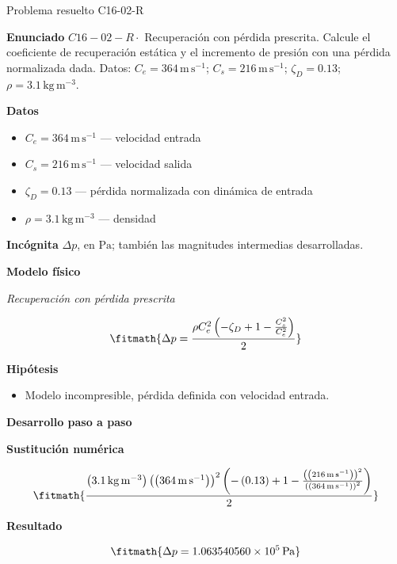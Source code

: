 \documentclass[10pt,openany]{book}
\begin{document}
\begin{studiumworked}{Problema resuelto C16-02-R}


\noindent\textbf{Enunciado}
\(C16-02-R \cdot\) Recuperación con pérdida prescrita. Calcule el coeficiente de recuperación estática y el incremento de presión con una pérdida normalizada dada. Datos: \(C_e=364\, \mathrm{m}\,\mathrm{s}^{-1}\); \(C_s=216\, \mathrm{m}\,\mathrm{s}^{-1}\); \(\zeta_D=0.13\); \(\rho=3.1\, \mathrm{kg}\,\mathrm{m}^{-3}\).

\noindent\textbf{Datos}
\begin{itemize}
\item $C_e = 364\,\mathrm{m}\,\mathrm{s}^{-1}$ — velocidad entrada
\item $C_s = 216\,\mathrm{m}\,\mathrm{s}^{-1}$ — velocidad salida
\item $\zeta_D = 0.13$ — pérdida normalizada con dinámica de entrada
\item $\rho = 3.1\,\mathrm{kg}\,\mathrm{m}^{-3}$ — densidad
\end{itemize}

\noindent\textbf{Incógnita}
$\Delta p$, en $\mathrm{Pa}$; también las magnitudes intermedias desarrolladas.

\noindent\textbf{Modelo físico}

\noindent\textit{Recuperación con pérdida prescrita}

\[
\fitmath{\Delta p=\frac{\rho C_e^{2} \left(- \zeta_D + 1 - \frac{C_s^{2}}{C_e^{2}}\right)}{2}}
\]

\noindent\textbf{Hipótesis}
\begin{itemize}
\item Modelo incompresible, pérdida definida con velocidad entrada.
\end{itemize}

\noindent\textbf{Desarrollo paso a paso}



\noindent\textbf{Sustitución numérica}

\[
\fitmath{\frac{\left(3.1\,\mathrm{kg}\,\mathrm{m}^{-3}\right) \left(\left(364\,\mathrm{m}\,\mathrm{s}^{-1}\right)\right)^{2} \left(- \left(0.13\right) + 1 - \frac{\left(\left(216\,\mathrm{m}\,\mathrm{s}^{-1}\right)\right)^{2}}{\left(\left(364\,\mathrm{m}\,\mathrm{s}^{-1}\right)\right)^{2}}\right)}{2}}
\]

\noindent\textbf{Resultado}

\[
\fitmath{\Delta p=1.063540560\times10^{5}\,\mathrm{Pa}}
\]


\end{studiumworked}
\end{document}
